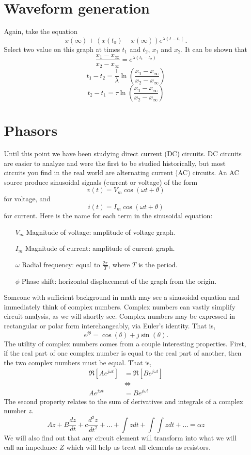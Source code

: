\documentclass[nobib]{tufte-handout}
\begin{document}
\section{Waveform generation}

Again, take the equation 
\[x(\infty) + (x(t_0)-x(\infty))e^{\lambda (t-t_0)}.\]
Select two value on this graph at times $t_1$ and $t_2$, 
$x_1$ and $x_2$. 
It can be shown that
\[\frac{x_1-x_{\infty}}{x_2-x_{\infty}} = e^{\lambda(t_t-t_2)}\]
\[t_1-t_2 = \frac{1}{\lambda} \ln{\left(\frac{x_1-x_{\infty}}{x_2-x_{\infty}}\right)}\]
\[t_2-t_1 = \tau \ln{\left(\frac{x_1-x_{\infty}}{x_2-x_{\infty}}\right)}\]

\section{Phasors}

Until this point we have been studying direct current (DC) circuits. 
DC circuits are easier to analyze and were the first to be 
studied historically, but most circuits you find in the real world are alternating
current (AC) circuits. An AC source
produce sinusoidal signals (current or voltage) of the form 
\[v(t) = V_m \cos(\omega t + \theta)\]
for voltage, and 
\[i(t) = I_m \cos(\omega t + \theta)\]
for current. Here is the name for each term in the sinusoidal equation:
\begin{itemize}
    \item[$V_m$] Magnitude of voltage: amplitude of voltage graph. 
    \item[$I_m$] Magnitude of current: amplitude of current graph. 
    \item[$\omega$] Radial frequency: equal to $\frac{2 \pi}{T}$, where 
    $T$ is the period. 
    \item[$\phi$] Phase shift: horizontal displacement of the graph from the origin. 
\end{itemize}

Someone with sufficient background in math may see a sinusoidal equation and 
immediately think of complex numbers. Complex numbers can vastly simplify 
circuit analysis, as we will shortly see. 
Complex numbers may be expressed in rectangular or polar form interchangeably, 
via Euler's identity. That is, 
\[e^{j\theta} = \cos(\theta) + j\sin(\theta).\]
The utility of complex numbers comes from a couple interesting properties.
First, if the real part of one complex number is equal to 
the real part of another, then the two complex numbers 
must be equal. That is, 
\begin{align*}
    \Re[Ae^{j\omega t}] &= \Re[Be^{j\omega t}] \\
    &\iff \\
    Ae^{j\omega t} &= Be^{j\omega t}
\end{align*}
The second property relates to the sum of derivatives and 
integrals of a complex number $z$. 
\[Az + B\frac{dz}{dt} + c\frac{d^2 z}{dt^2} + \dots + \int z dt + \int \int z dt + \dots = \alpha z\]
We will also find out that any circuit element
will transform into what we will call an impedance $Z$ which will help us treat
all elements as resistors. 
\end{document}
